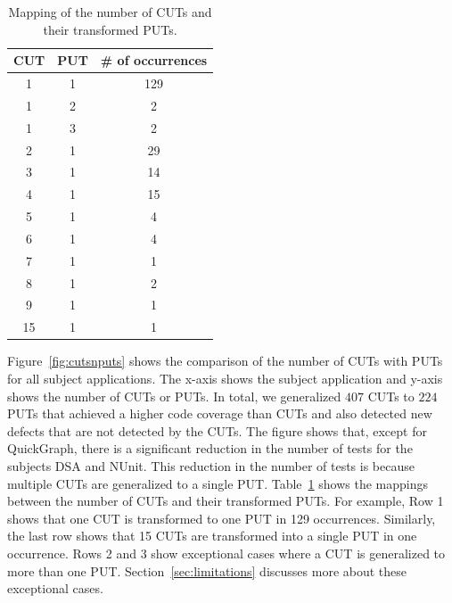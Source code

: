 \begin{table}[t]
\begin{CodeOut}
\begin{center}
\centering \caption {\label{tab:cutputmapping} Mapping of the number of CUTs and their transformed PUTs.}
\begin {tabular} {|c|c|c|}
\hline \textbf{CUT} & \textbf{PUT} & \textbf{\# of occurrences}\\
\hline
\hline 1   & 1   & 129\\
\hline 1   & 2   & 2\\
\hline 1   & 3   & 2\\
\hline 2   & 1   & 29\\
\hline 3   & 1   & 14\\
\hline 4   & 1   & 15\\
\hline 5   & 1   & 4\\
\hline 6   & 1   & 4\\
\hline 7   & 1   & 1\\
\hline 8   & 1   & 2\\
\hline 9   & 1   & 1\\
\hline 15   & 1   & 1\\
\hline
\end{tabular}\vspace*{-3ex}
\end{center}
\end{CodeOut}
\end{table}

Figure~\ref{fig:cutsnputs} shows the comparison of the number of CUTs with PUTs for all subject applications. The x-axis shows the subject application and y-axis shows the number of CUTs or PUTs. In total, we generalized $407$ CUTs to $224$ PUTs that achieved a higher code coverage than CUTs and also detected new defects that are not detected by the CUTs. The figure shows that, except for QuickGraph, there is a significant reduction in the number of tests for the subjects DSA and NUnit. This reduction in the number of tests is because multiple CUTs are generalized to a single PUT. Table~\ref{tab:cutputmapping} shows the mappings between the number of CUTs and their transformed PUTs. For example, Row 1 shows that one CUT is transformed to one PUT in 129 occurrences. Similarly, the last row shows that 15 CUTs are transformed into a single PUT in one occurrence. Rows 2 and 3 show exceptional cases where a CUT is generalized to more than one PUT. Section~\ref{sec:limitations} discusses more about these exceptional cases. 

